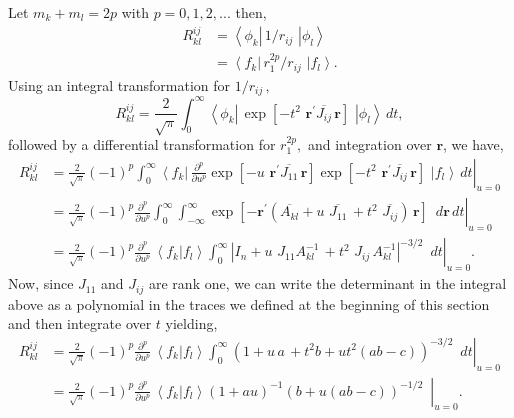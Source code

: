 \documentclass[12pt]{article}
\begin{document}
Let $m_{k}+m_{l}=2p$ with $p=0,1,2,...$ then,
\begin{align}
R_{kl}^{ij} &  =\left\langle \phi_{k}\right|  \,1/r_{ij}\,\mathbf{\,}\left|
\phi_{l}\right\rangle \\
&  =\left\langle f_{k}\right|  \,r_{1}^{2p}/r_{ij}\,\mathbf{\,}\left|
f_{l}\right\rangle .
\end{align}
Using an integral transformation for $1/r_{ij}\,,$%
\begin{equation}
R_{kl}^{ij}=\frac{2}{\sqrt{\pi}}\int_{0}^{\infty}\left\langle \phi_{k}\right|
\,\exp\left[  -t^{2}\,\,\mathbf{r}^{\prime}\overline{J_{ij}}\,\mathbf{r}%
\right]  \,\mathbf{\,}\left|  \phi_{l}\right\rangle \,dt,
\end{equation}
followed by a differential transformation for $r_{1}^{2p},$ and integration
over $\mathbf{r}$, we have,
\begin{align}
R_{kl}^{ij} &  =\left.  \frac{2}{\sqrt{\pi}}\left(  -1\right)  ^{p}\int
_{0}^{\infty}\left\langle f_{k}\right|  \,\frac{\partial^{p}}{\partial u^{p}%
}\exp\left[  -u\,\,\mathbf{r}^{\prime}\overline{J_{11}}\,\mathbf{r}\right]
\exp\left[  -t^{2}\,\,\mathbf{r}^{\prime}\overline{J_{ij}}\,\mathbf{r}\right]
\,\mathbf{\,}\left|  f_{l}\right\rangle \,dt\right|  _{u=0}\nonumber\\
&  =\left.  \frac{2}{\sqrt{\pi}}\left(  -1\right)  ^{p}\frac{\partial^{p}%
}{\partial u^{p}}\int_{0}^{\infty}\int_{-\infty}^{\infty}\exp\left[
-\mathbf{r}^{\prime}\left(  \overline{A_{kl}}+u\,\,\overline{J_{11}}%
\,+t^{2}\,\,\overline{J_{ij}}\right)  \,\mathbf{r}\right]  \,\mathbf{\,}%
\,d\mathbf{r}\,dt\right|  _{u=0}\nonumber\\
&  =\left.  \frac{2}{\sqrt{\pi}}\left(  -1\right)  ^{p}\frac{\partial^{p}%
}{\partial u^{p}}\,\left\langle f_{k}\right.  |\left.  f_{l}\right\rangle
\int_{0}^{\infty}\left|  I_{n}+u\,\,J_{11}A_{kl}^{-1}\,+t^{2}\,\,J_{ij}%
\,A_{kl}^{-1}\right|  ^{-3/2}\mathbf{\,}\,\,dt\right|  _{u=0}.
\end{align}
Now, since $J_{11}$ and $J_{ij}$ are rank one, we can write the determinant in
the integral above as a polynomial in the traces we defined at the beginning
of this section and then integrate over $t$ yielding,
\begin{align}
R_{kl}^{ij} &  =\left.  \frac{2}{\sqrt{\pi}}\left(  -1\right)  ^{p}%
\frac{\partial^{p}}{\partial u^{p}}\,\left\langle f_{k}\right.  |\left.
f_{l}\right\rangle \int_{0}^{\infty}\left(  1+u\,a\,+t^{2}b+ut^{2}\left(
ab-c\right)  \right)  ^{-3/2}\mathbf{\,}\,\,dt\right|  _{u=0}\nonumber\\
&  =\left.  \frac{2}{\sqrt{\pi}}\left(  -1\right)  ^{p}\frac{\partial^{p}%
}{\partial u^{p}}\,\left\langle f_{k}\right.  |\left.  f_{l}\right\rangle
\left(  1+au\right)  ^{-1}\left(  b+u\left(  ab-c\right)  \right)
^{-1/2}\mathbf{\,}\,\,\right|  _{u=0}.
\end{align}
\end{document}
